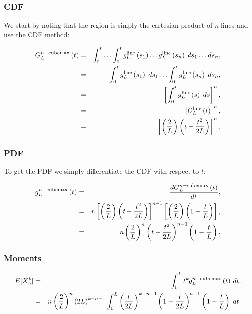\subsubsection{CDF}

We start by noting that the region is simply the cartesian product of $n$ lines and use the CDF method:

\begin{eqnarray}
 G^{n-{\rm cube max}}_L\left(t\right) & = & \int_{0}^{t} \ldots \int_{0}^{t}   g^{\rm line}_L\left(s_{1}\right)\ldots g^{\rm line}_L\left(s_{n}\right) \;ds_{1}\ldots ds_{n}, \nonumber \\
 & = & \int_{0}^{t}  g^{\rm line}_L\left(s_{1}\right) \;ds_{1}   \ldots \int_{0}^{t} g^{\rm line}_L\left(s_{n}\right) \;ds_{n},\nonumber \\
 & = & \left[\int_{0}^{t}  g^{\rm line}_L\left(s\right) \;ds \right]^{n},\nonumber \\
 & = & \left[G^{\rm line}_L\left(t\right)\right]^{n} ,\nonumber \\
 & = &  \left[\left(\frac{2}{L}\right)\left( t - \frac{t^2}{2L} \right)\right]^{n}.
\end{eqnarray}

\subsubsection{PDF}
To get the PDF we simply differentiate the CDF with respect to $t$:

\begin{eqnarray}
 g^{n-{\rm cube max}}_L\left(t\right) & = & \frac{d G^{n-{\rm cube max}}_L\left(t\right)}{dt},\nonumber \\
& = &  n\left[\left(\frac{2}{L}\right)\left( t - \frac{t^2}{2L} \right)\right]^{n-1} \left[\left(\frac{2}{L}\right)\left( 1 - \frac{t}{L} \right)\right],\nonumber \\
& = &  n\left(\frac{2}{L}\right)^{n} \left( t - \frac{t^2}{2L} \right)^{n-1}\left( 1 - \frac{t}{L} \right), \nonumber \\
\end{eqnarray} 
 
\subsubsection{Moments}

\begin{eqnarray}
E[ X^{k}_{n} ]  & = & \int_0^L t^k  g^{n-{\rm cube max}}_L\left(t\right) \, dt, \nonumber \\
& = &   n\left(\frac{2}{L}\right)^{n} \left(2L\right)^{k + n -1} \int_0^L \left(\frac{t}{2L}\right)^{k + n -1} \left( 1 - \frac{t}{2L} \right)^{n-1}\left( 1 - \frac{t}{L} \right) \; dt.
\end{eqnarray} 

